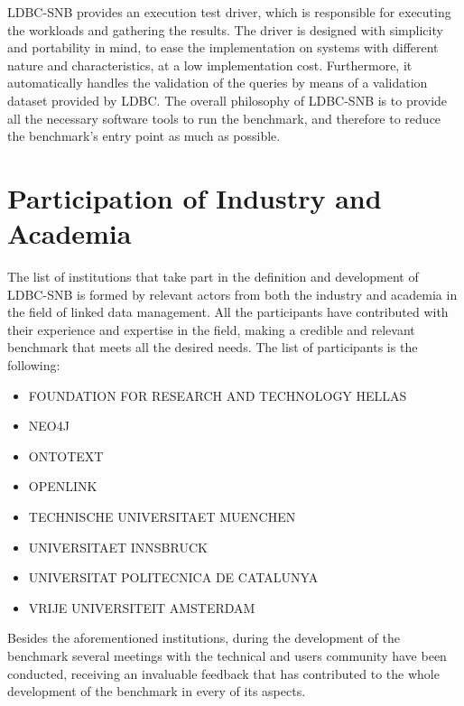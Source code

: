 LDBC-SNB provides an execution test driver, which is responsible for executing
the workloads and gathering the results. The driver is designed with simplicity
and portability in mind, to ease the implementation on systems with different
nature and characteristics, at a low implementation cost. Furthermore, it
automatically handles the validation of the queries by means of a validation
dataset provided by LDBC.  The overall philosophy of LDBC-SNB is to provide all
the necessary software tools to run the benchmark, and therefore to reduce the
benchmark's entry point as much as possible.


\section{Participation of Industry and Academia}

The list of institutions that take part in the definition and development
of LDBC-SNB is formed by relevant actors from both the industry and academia in
the field of linked data management. All the participants have contributed with
their experience and expertise in the field, making a credible and relevant
benchmark that meets all the desired needs. The list of participants is the
following:

\begin{itemize}
    \item FOUNDATION FOR RESEARCH AND TECHNOLOGY HELLAS
    \item NEO4J
    \item ONTOTEXT
    \item OPENLINK
    \item TECHNISCHE UNIVERSITAET MUENCHEN
    \item UNIVERSITAET INNSBRUCK
    \item UNIVERSITAT POLITECNICA DE CATALUNYA
    \item VRIJE UNIVERSITEIT AMSTERDAM
\end{itemize}

\begin{figure}
\end{figure}

Besides the aforementioned institutions, during the development of the
benchmark several meetings with the technical and users community have been
conducted, receiving an invaluable feedback that has contributed to the whole
development of the benchmark in every of its aspects.

